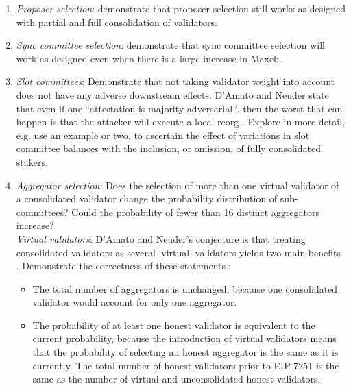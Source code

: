 \documentclass[UTF8]{article}
\begin{document}
\begin{enumerate}

\item \textit{Proposer selection}: demonstrate that proposer selection still works as designed with partial and full consolidation of validators.

\item \textit{Sync committee selection}: demonstrate that sync committee selection will work as designed even when there is a large increase in Max\gls{eb}.

\item \textit{Slot committees}: Demonstrate that not taking validator weight into account does not have any adverse downstream effects. D'Amato and Neuder state that even if one ``attestation is majority adversarial'', then the worst that can happen is that the attacker will execute a local reorg \cite{damato2023}. Explore in more detail, e.g. use an example or two, to ascertain the effect of variations in slot committee balances with the inclusion, or omission, of fully consolidated stakers. 

\item \textit{Aggregator selection}: Does the selection of more than one virtual validator of a consolidated validator change the probability distribution of sub-committees? Could the probability of fewer than 16 distinct aggregators increase? \\
\textit{Virtual validators}: D'Amato and Neuder's conjecture is that treating consolidated validators as several `virtual' validators yields two main benefits \cite{damato2023}. Demonstrate the correctness of these statements.:
	\begin{itemize}
	\item The total number of aggregators is unchanged, because one consolidated validator would account for only one aggregator.
	\item The probability of at least one honest validator is equivalent to the current probability, because the introduction of virtual validators means that the probability of selecting an honest aggregator is the same as it is currently. The total number of honest validators prior to EIP-7251 is the same as the number of virtual and unconsolidated honest validators.
	\end{itemize}
	
\end{enumerate}


\end{document}
